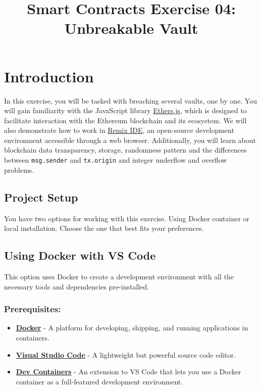 \documentclass[12pt]{article}
\title{Smart Contracts Exercise 04: \\ Unbreakable Vault}
\author{}
\date{}
\begin{document}
\maketitle
\section{Introduction}
In this exercise, you will be tasked with breaching several vaults, one by one.
You will gain familiarity with the JavaScript library
\href{https://docs.ethers.org/v6}{Ethers.js}, which is designed to facilitate
interaction with the Ethereum blockchain and its ecosystem. We will also
demonstrate how to work in \href{https://remix.ethereum.org/}{Remix IDE}, an
open-source development environment accessible through a web browser.
Additionally, you will learn about blockchain data transparency, storage,
randomness pattern and the differences between \texttt{msg.sender} and
\texttt{tx.origin} and integer underflow and overflow problems.

\subsection*{Project Setup}

You have two options for working with this exercise. Using Docker container or
local installation. Choose the one that best fits your preferences.

\subsection{Using Docker with VS Code}

This option uses Docker to create a development environment with all the
necessary tools and dependencies pre-installed.

\subsubsection*{Prerequisites:}

\begin{itemize}
    \item \textbf{\href{https://www.docker.com/products/docker-desktop}{Docker}} - A platform for developing, shipping, and running applications in containers.
    \item \textbf{\href{https://code.visualstudio.com/}{Visual Studio Code}} - A lightweight but powerful source code editor.
    \item \textbf{\href{https://marketplace.visualstudio.com/items?itemName=ms-vscode-remote.remote-containers}{Dev Containers}} - An extension to VS Code that lets you use a Docker container as a full-featured development environment.
\end{itemize}
\end{document}

